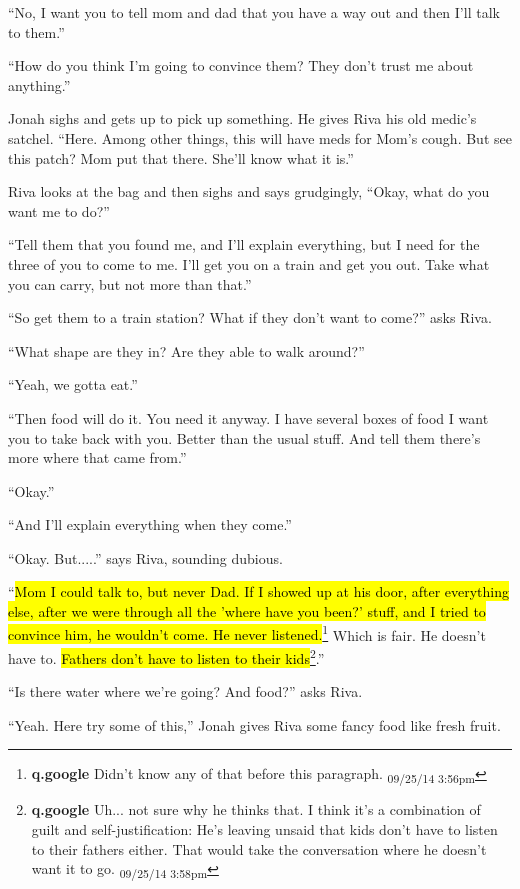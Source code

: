 ``No, I want you to tell mom and dad that you have a way out and then I'll talk to them.''

``How do you think I'm going to convince them?  They don't trust me about anything.''

Jonah sighs and gets up to pick up something.  He gives Riva his old medic's satchel.  ``Here.  Among other things, this will have meds for Mom's cough.  But see this patch?  Mom put that there.  She'll know what it is.''

Riva looks at the bag and then sighs and says grudgingly, ``Okay, what do you want me to do?''

``Tell them that you found me, and I'll explain everything, but I need for the three of you to come to me.  I'll get you on a train and get you out.  Take what you can carry, but not more than that.''

``So get them to a train station?  What if they don't want to come?'' asks Riva.

``What shape are they in?  Are they able to walk around?''

``Yeah, we gotta eat.''

``Then food will do it.  You need it anyway.  I have several boxes of food I want you to take back with you.  Better than the usual stuff.  And tell them there's more where that came from.''

``Okay.''

``And I'll explain everything when they come.''

``Okay.  But.....'' says Riva, sounding dubious.

``\hl{Mom I could talk to, but never Dad.  If I showed up at his door, after everything else, after we were through all the 'where have you been?' stuff, and I tried to convince him, he wouldn't come.  He never listened.}\footnote{\textbf{q.google }Didn't know any of that before this paragraph. \textsubscript{09/25/14 3:56pm}}  Which is fair.  He doesn't have to.  \hl{Fathers don't have to listen to their kids}\footnote{\textbf{q.google }Uh... not sure why he thinks that.  I think it's a combination of guilt and self-justification: He's leaving unsaid that kids don't have to listen to their fathers either.  That would take the conversation where he doesn't want it to go. \textsubscript{09/25/14 3:58pm}}.''

``Is there water where we're going?  And food?'' asks Riva.

``Yeah.  Here try some of this,'' Jonah gives Riva some fancy food like fresh fruit.

